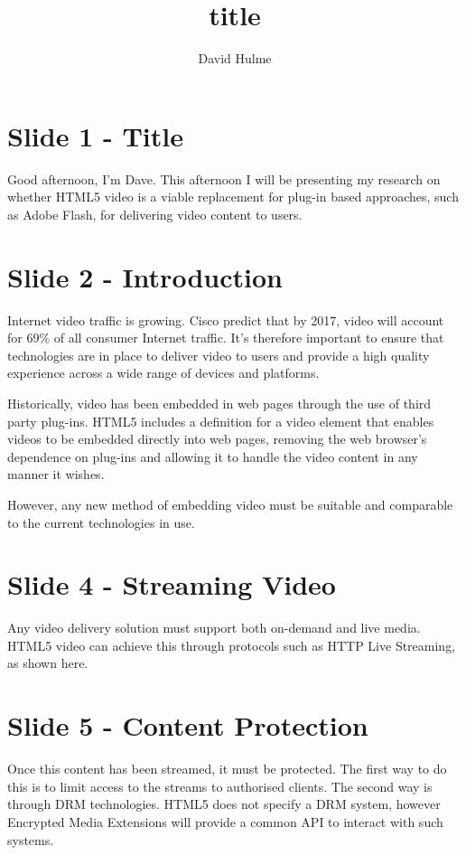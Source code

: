 \documentclass[a4paper]{article}
\title{title}
\author{David Hulme}
\begin{document}
\pagestyle{fancy}
\fancyhead{}
\fancyfoot{}
\fancyfoot[RO, RE]{\today}



\section*{Slide 1 - Title}
Good afternoon, I'm Dave. This afternoon I will be presenting my research on whether HTML5 video is a viable replacement for plug-in based approaches, such as Adobe Flash, for delivering video content to users.

\section*{Slide 2 - Introduction}
Internet video traffic is growing. Cisco predict that by 2017, video will account for 69\% of all consumer Internet traffic. It's therefore important to ensure that technologies are in place to deliver video to users and provide a high quality experience across a wide range of devices and platforms.

Historically, video has been embedded in web pages through the use of third party plug-ins. HTML5 includes a definition for a video element that enables videos to be embedded directly into web pages, removing the web browser's dependence on plug-ins and allowing it to handle the video content in any manner it wishes.

However, any new method of embedding video must be suitable and comparable to the current technologies in use.

\section*{Slide 4 - Streaming Video}
Any video delivery solution must support both on-demand and live media. HTML5 video can achieve this through protocols such as HTTP Live Streaming, as shown here.

\section*{Slide 5 - Content Protection}
Once this content has been streamed, it must be protected. The first way to do this is to limit access to the streams to authorised clients. The second way is through DRM technologies. HTML5 does not specify a DRM system, however Encrypted Media Extensions will provide a common API to interact with such systems.
\end{document}
